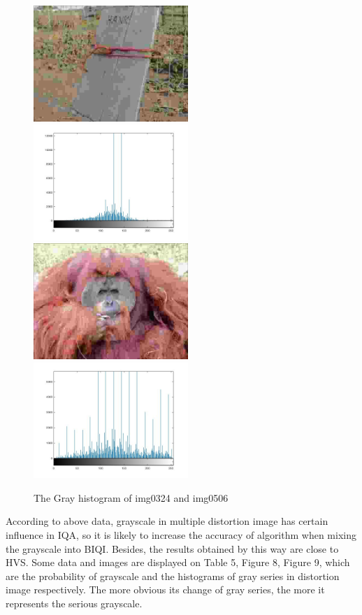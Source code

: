 \begin{figure}[htbp] %
   \centering
   		\includegraphics[width=2.3in]{images/img0324.jpg} 
		\includegraphics[width=2.3in]{images/imgMDID0324.jpg}    		
   		\includegraphics[width=2.3in]{images/img0506.jpg} 
		\includegraphics[width=2.3in]{images/imgMDID0506.jpg} 
          	 \caption{The Gray histogram of img0324 and img0506}
\end{figure}

According to above data, grayscale in multiple distortion image has certain influence in IQA, so it is likely to increase the accuracy of algorithm when mixing the grayscale into BIQI. Besides, the results obtained by this way are close to HVS. Some data and images are displayed on Table 5, Figure 8, Figure 9, which are the probability of grayscale and the histograms of gray series in distortion image respectively. The more obvious its change of gray series, the more it represents the serious grayscale. 


